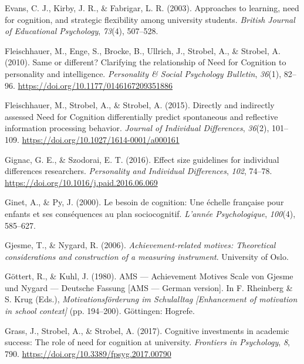 \documentclass[
  man]{apa6}
\newlength{\cslhangindent}
\newlength{\cslentryspacingunit} %
\newenvironment{CSLReferences}[2] %
 {%
  \setlength{\parindent}{0pt}
  \ifodd #1
  \let\oldpar\par
  \def\par{\hangindent=\cslhangindent\oldpar}
  \fi
  \setlength{\parskip}{#2\cslentryspacingunit}
 }%
 {}
\begin{document}
\begin{CSLReferences}{1}{0}
\leavevmode{}%
Evans, C. J., Kirby, J. R., \& Fabrigar, L. R. (2003). Approaches to learning, need for cognition, and strategic flexibility among university students. \emph{British Journal of Educational Psychology}, \emph{73}(4), 507--528.

\leavevmode{}%
Fleischhauer, M., Enge, S., Brocke, B., Ullrich, J., Strobel, A., \& Strobel, A. (2010). Same or different? Clarifying the relationship of {N}eed for {C}ognition to personality and intelligence. \emph{Personality \& Social Psychology Bulletin}, \emph{36}(1), 82--96. \url{https://doi.org/10.1177/0146167209351886}

\leavevmode{}%
Fleischhauer, M., Strobel, A., \& Strobel, A. (2015). Directly and indirectly assessed {N}eed for {C}ognition differentially predict spontaneous and reflective information processing behavior. \emph{Journal of Individual Differences}, \emph{36}(2), 101--109. \url{https://doi.org/10.1027/1614-0001/a000161}

\leavevmode{}%
Gignac, G. E., \& Szodorai, E. T. (2016). Effect size guidelines for individual differences researchers. \emph{Personality and Individual Differences}, \emph{102}, 74--78. \url{https://doi.org/10.1016/j.paid.2016.06.069}

\leavevmode{}%
Ginet, A., \& Py, J. (2000). Le besoin de cognition: Une {é}chelle fran{ç}aise pour enfants et ses cons{é}quences au plan sociocognitif. \emph{L'ann{é}e Psychologique}, \emph{100}(4), 585--627.

\leavevmode{}%
Gjesme, T., \& Nygard, R. (2006). \emph{Achievement-related motives: Theoretical considerations and construction of a measuring instrument}. University of Oslo.

\leavevmode{}%
Göttert, R., \& Kuhl, J. (1980). AMS --- {A}chievement {M}otives {S}cale von {G}jesme und {N}ygard --- {D}eutsche {F}assung {[}{AMS} --- {G}erman version{]}. In F. Rheinberg \& S. Krug (Eds.), \emph{Motivationsf{ö}rderung im {S}chulalltag {[}{E}nhancement of motivation in school context{]}} (pp. 194--200). G{ö}ttingen: Hogrefe.

\leavevmode{}%
Grass, J., Strobel, A., \& Strobel, A. (2017). Cognitive investments in academic success: The role of need for cognition at university. \emph{Frontiers in Psychology}, \emph{8}, 790. \url{https://doi.org/10.3389/fpsyg.2017.00790}


\end{CSLReferences}
\end{document}
